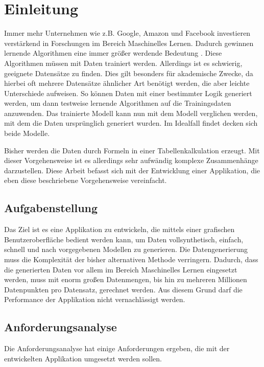 
\chapter{Einleitung}

Immer mehr Unternehmen wie z.B. Google, Amazon und Facebook investieren verstärkend in Forschungen im Bereich Maschinelles Lernen. Dadurch gewinnen lernende Algorithmen eine immer größer werdende Bedeutung \cite{mengesonnentag:2018}. Diese Algorithmen müssen mit Daten trainiert werden. Allerdings ist es schwierig, geeignete Datensätze zu finden. Dies gilt besonders für akademische Zwecke, da hierbei oft mehrere Datensätze ähnlicher Art benötigt werden, die aber leichte Unterschiede aufweisen. So können Daten mit einer bestimmter Logik generiert werden, um dann testweise lernende Algorithmen auf die Trainingsdaten anzuwenden. Das trainierte Modell kann nun mit dem Modell verglichen werden, mit dem die Daten ursprünglich generiert wurden. Im Idealfall findet decken sich beide Modelle.

Bisher werden die Daten durch Formeln in einer Tabellenkalkulation erzeugt. Mit dieser Vorgehensweise ist es allerdings sehr aufwändig komplexe Zusammenhänge darzustellen. Diese Arbeit befasst sich mit der Entwicklung einer Applikation, die eben diese beschriebene Vorgehensweise vereinfacht.

\section{Aufgabenstellung}

Das Ziel ist es eine Applikation zu entwickeln, die mittels einer grafischen Benutzeroberfläche bedient werden kann, um Daten vollsynthetisch, einfach, schnell und nach vorgegebenen Modellen zu generieren. Die Datengenerierung muss die Komplexität der bisher alternativen Methode verringern. Dadurch, dass die generierten Daten vor allem im Bereich Maschinelles Lernen eingesetzt werden, muss mit enorm großen Datenmengen, bis hin zu mehreren Millionen Datenpunkten pro Datensatz, gerechnet werden. Aus diesem Grund darf die Performance der Applikation nicht vernachlässigt werden.

\section{Anforderungsanalyse}
\label{sec:anforderungsanalyse}

Die Anforderungsanalyse hat einige Anforderungen ergeben, die mit der entwickelten Applikation umgesetzt werden sollen.

